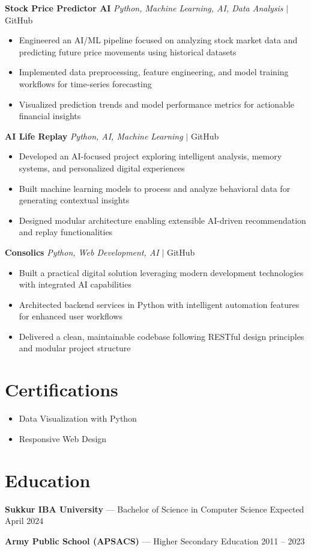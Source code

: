 \documentclass[11pt,a4paper]{article}
\begin{document}
\textbf{Stock Price Predictor AI} \hfill \textit{Python, Machine Learning, AI, Data Analysis} $|$ GitHub
\begin{itemize}
    \item Engineered an AI/ML pipeline focused on analyzing stock market data and predicting future price movements using historical datasets
    \item Implemented data preprocessing, feature engineering, and model training workflows for time-series forecasting
    \item Visualized prediction trends and model performance metrics for actionable financial insights
\end{itemize}

\textbf{AI Life Replay} \hfill \textit{Python, AI, Machine Learning} $|$ GitHub
\begin{itemize}
    \item Developed an AI-focused project exploring intelligent analysis, memory systems, and personalized digital experiences
    \item Built machine learning models to process and analyze behavioral data for generating contextual insights
    \item Designed modular architecture enabling extensible AI-driven recommendation and replay functionalities
\end{itemize}

\textbf{Consolics} \hfill \textit{Python, Web Development, AI} $|$ GitHub
\begin{itemize}
    \item Built a practical digital solution leveraging modern development technologies with integrated AI capabilities
    \item Architected backend services in Python with intelligent automation features for enhanced user workflows
    \item Delivered a clean, maintainable codebase following RESTful design principles and modular project structure
\end{itemize}

\section{Certifications}
\begin{itemize}
    \item Data Visualization with Python
    \item Responsive Web Design
\end{itemize}

\section{Education}

\textbf{Sukkur IBA University} --- Bachelor of Science in Computer Science \hfill Expected April 2024

\vspace{0.5em}
\textbf{Army Public School (APSACS)} --- Higher Secondary Education \hfill 2011 -- 2023
\end{document}
